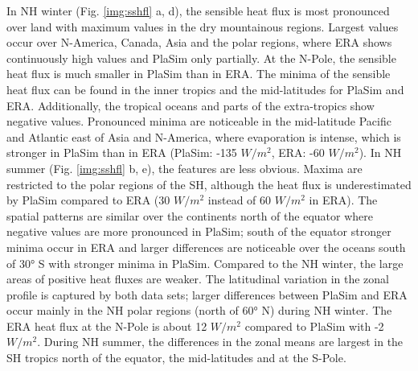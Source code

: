 \documentclass[12pt,a4paper,twoside,openright,headinclude,liststotoc,bibtotoc]{scrreprt}
\begin{document}
In NH winter (Fig. \ref{img:sshfl} a, d), the sensible heat flux is most pronounced over land with maximum values in the dry mountainous regions. Largest values occur over N-America, Canada, Asia and the polar regions, where ERA shows continuously high values and PlaSim only partially. At the N-Pole, the sensible heat flux is much smaller in PlaSim than in ERA. The minima of the sensible heat flux can be found in the inner tropics and the mid-latitudes for PlaSim and ERA. Additionally, the tropical oceans and parts of the extra-tropics show negative values. Pronounced minima are noticeable in the mid-latitude Pacific and Atlantic east of Asia and N-America, where evaporation is intense, which is stronger in PlaSim than in ERA (PlaSim: -135 $W/m^2$, ERA: -60 $W/m^2$). In NH summer (Fig. \ref{img:sshfl} b, e), the features are less obvious. Maxima are restricted to the polar regions of the SH, although the heat flux is underestimated by PlaSim compared to ERA (30 $W/m^2$ instead of 60 $W/m^2$ in ERA). The spatial patterns are similar over the continents north of the equator where negative values are more pronounced in PlaSim; south of the equator stronger minima occur in ERA and larger differences are noticeable over the oceans south of 30° S with stronger minima in PlaSim. Compared to the NH winter, the large areas of positive heat fluxes are weaker. The latitudinal variation in the zonal profile is captured by both data sets; larger differences between PlaSim and ERA occur mainly in the NH polar regions (north of 60° N) during NH winter. The ERA heat flux at the N-Pole is about 12 $W/m^2$ compared to PlaSim with -2 $W/m^2$. During NH summer, the differences in the zonal means are largest in the SH tropics north of the equator, the mid-latitudes and at the S-Pole.
\end{document}
